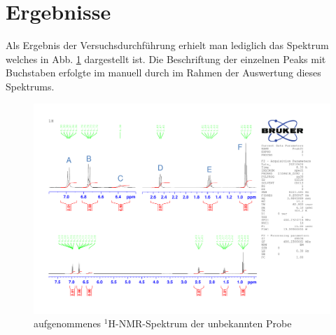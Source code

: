 \section{Ergebnisse}
\label{sec:ergebnisse}

Als Ergebnis der Versuchsdurchführung erhielt man lediglich das Spektrum welches in Abb. \ref{fig:spektrum_original} dargestellt ist. Die Beschriftung der einzelnen Peaks mit Buchstaben erfolgte im manuell durch im Rahmen der Auswertung dieses Spektrums.

\begin{figure}[h!]
		\centering
		\includegraphics[page=1, width=\textwidth]{dokumente/spektrum_original.pdf}
		\caption{aufgenommenes ${}^1$H-NMR-Spektrum der unbekannten Probe}
		\label{fig:spektrum_original}
\end{figure}
\FloatBarrier
